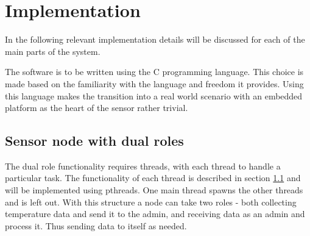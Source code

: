 \section{Implementation}
\label{sec:implementation}
In the following relevant implementation details will be discussed for each of the main parts of the system. 

The software is to be written using the C programming language. This choice is made based on the familiarity with the language and freedom it provides. Using this language makes the transition into a real world scenario with an embedded platform as the heart of the sensor rather trivial. 
\subsection{Sensor node with dual roles}
\label{subsec:sensornodedesign}
The dual role functionality requires threads, with each thread to handle a particular task. The functionality of each thread is described in section \ref{subsec:sensornodedesign} and will be implemented using pthreads.
 One main thread spawns the other threads and is left out. With this structure a node can take two roles - both collecting temperature data and send it to the admin, and receiving data as an admin and process it. Thus sending data to itself as needed.

